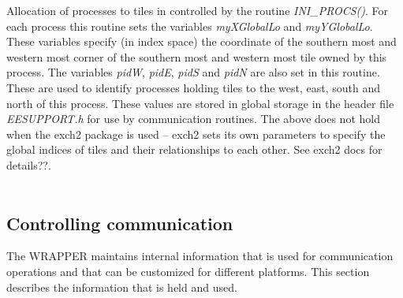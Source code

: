 Allocation of processes to tiles in controlled by the routine
{\em INI\_PROCS()}. For each process this routine sets
the variables {\em myXGlobalLo} and {\em myYGlobalLo}.
These variables specify (in index space) the coordinate
of the southern most and western most corner of the 
southern most and western most tile owned by this process.
The variables {\em pidW}, {\em pidE}, {\em pidS} and {\em pidN}
are also set in this routine. These are used to identify
processes holding tiles to the west, east, south and north 
of this process. These values are stored in global storage
in the header file {\em EESUPPORT.h} for use by
communication routines.  The above does not hold when the 
exch2 package is used -- exch2 sets its own parameters to 
specify the global indices of tiles and their relationships
to each other.  See exch2 docs for details??.
\\

 \\


\subsection{Controlling communication}
The WRAPPER maintains internal information that is used for communication
operations and that can be customized for different platforms. This section 
describes the information that is held and used.

